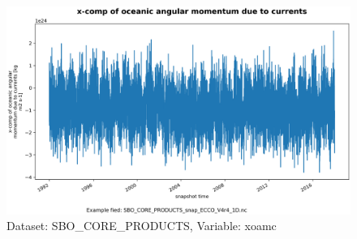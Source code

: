 \begin{figure}[H]
\centering
\includegraphics[scale=0.55]{../images/plots/oneD_plots/SBO_Core_Products/xoamc.png}
\caption{Dataset: SBO\_CORE\_PRODUCTS, Variable: xoamc}
\label{tab:table-SBO_CORE_PRODUCTS_xoamc-Plot}
\end{figure}
\pagebreak
